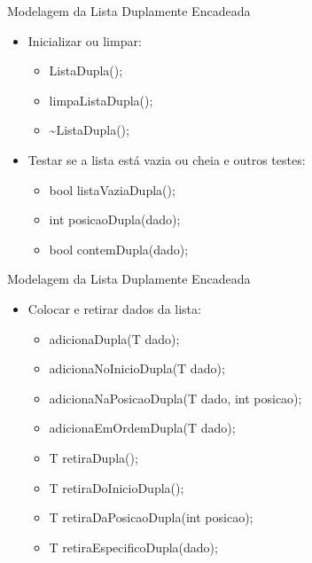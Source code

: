 \documentclass[12pt,table,xcolor={dvipsnames}]{beamer}
\begin{document}
\begin{frame}[fragile]{Modelagem da Lista Duplamente Encadeada}

\begin{itemize}
\item Inicializar ou limpar:
\begin{itemize}
\item ListaDupla();
\item limpaListaDupla();
\item \~{}ListaDupla();
\end{itemize}
\item Testar se a lista está vazia ou cheia e outros testes:
\begin{itemize}
\item bool listaVaziaDupla();
\item int posicaoDupla(dado);
\item bool contemDupla(dado);
\end{itemize}
\end{itemize}
\end{frame}

\begin{frame}[fragile]{Modelagem da Lista Duplamente Encadeada}

\begin{itemize}
\item Colocar e retirar dados da lista:
\begin{itemize}
\item adicionaDupla(T dado);
\item adicionaNoInicioDupla(T dado);
\item adicionaNaPosicaoDupla(T dado, int posicao);
\item adicionaEmOrdemDupla(T dado);
\item T retiraDupla();
\item T retiraDoInicioDupla();
\item T retiraDaPosicaoDupla(int posicao);
\item T retiraEspecificoDupla(dado);
\end{itemize}
\end{itemize}
\end{frame}
\end{document}
